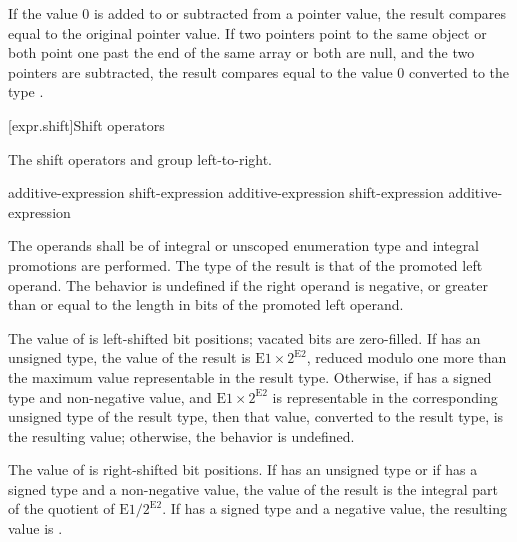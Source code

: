 \pnum
If the value 0 is added to or subtracted from a pointer value, the
result compares equal to the original pointer value. If two pointers
point to the same object or both point one past the end of the same
array or both are null, and the two pointers are subtracted, the result
compares equal to the value 0 converted to the type
.

[expr.shift]{Shift operators}

\pnum
{}%
%
%
%
%
The shift operators \tcode{\shl} and \tcode{\shr} group left-to-right.

%
%
%
%
%
\begin{bnf}
\br
    additive-expression\br
    shift-expression \terminal{\shl} additive-expression\br
    shift-expression \terminal{\shr} additive-expression
\end{bnf}

The operands shall be of integral or unscoped enumeration type and integral
promotions are performed. The type of the result is that of the promoted
left operand.
%
The behavior is undefined if the right operand is negative, or greater
than or equal to the length in bits of the promoted left operand.

\pnum
The value of  is  left-shifted  bit positions; vacated bits are
zero-filled. If  has an unsigned type, the value of the result
is $\mathrm{E1}\times2^\mathrm{E2}$, reduced modulo
one more than the maximum value representable in the result type. Otherwise, if
 has a signed type and non-negative value, and $\mathrm{E1}\times2^\mathrm{E2}$ is
representable in the corresponding unsigned type of the result type, then
that value, converted to the result type, is the resulting value; otherwise, the
behavior is undefined.

\pnum
The value of  is  right-shifted 
bit positions. If  has an unsigned type or if  has a
signed type and a non-negative value, the value of the result is the
integral part of the quotient of $\mathrm{E1}/2^\mathrm{E2}$. If 
%
has a signed type and a negative value, the resulting value is
.

